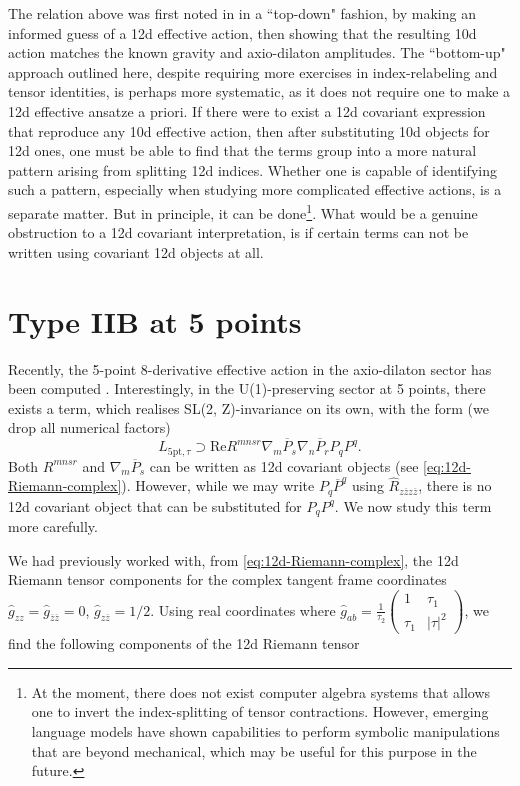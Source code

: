 The relation above was first noted in \cite{Minasian:2015bxa} in a ``top-down" fashion, by making an informed guess of a 12d effective action, then showing that the resulting 10d action matches the known gravity and axio-dilaton amplitudes.
The ``bottom-up" approach outlined here, despite requiring more exercises in index-relabeling and tensor identities, is perhaps more systematic, as it does not require one to make a 12d effective ansatze a priori.
If there were to exist a 12d covariant expression that reproduce any 10d effective action, then after substituting 10d objects for 12d ones, one must be able to find that the terms group into a more natural pattern arising from splitting 12d indices.
Whether one is capable of identifying such a pattern, especially when studying more complicated effective actions, is a separate matter.
But in principle, it can be done\footnote{
    At the moment, there does not exist computer algebra systems that allows one to invert the index-splitting of tensor contractions.
    However, emerging language models have shown capabilities to perform symbolic manipulations that are beyond mechanical, which may be useful for this purpose in the future. 
}.
What would be a genuine obstruction to a 12d covariant interpretation, is if certain terms can not be written using covariant 12d objects at all.

\section{Type IIB at 5 points}

Recently, the 5-point 8-derivative effective action in the axio-dilaton sector has been computed \cite{Liu:2025uqu}.
Interestingly, in the U(1)-preserving sector at 5 points, there exists a term, which realises SL(2, Z)-invariance on its own, with the form (we drop all numerical factors)
\begin{equation}
L_{\text{5pt},\tau} \supset
\text{Re} R^{mnsr} \nabla_m \overline{P}_s \nabla_n \overline{P}_r P_q P^q.
\label{eq:12d-obstruction}
\end{equation}
Both $R^{mnsr}$ and $\nabla_m \overline{P}_s$ can be written as 12d covariant objects (see \eqref{eq:12d-Riemann-complex}).
However, while we may write $P_q \overline{P}^q$ using $\widehat{R}_{z\overline{z}z\overline{z}}$, there is no 12d covariant object that can be substituted for $P_q P^q$.
We now study this term more carefully.

We had previously worked with, from \eqref{eq:12d-Riemann-complex}, the 12d Riemann tensor components for the complex tangent frame coordinates $\widehat{g}_{zz} = \widehat{g}_{\overline{z}\overline{z}} = 0$, $\widehat{g}_{z\overline{z}} = 1/2$. Using real coordinates where $\widehat{g}_{ab} = \frac{1}{\tau_2}\begin{pmatrix}
1 & \tau_1 \\
\tau_1 & |\tau|^2
\end{pmatrix}$, we find the following components of the 12d Riemann tensor

